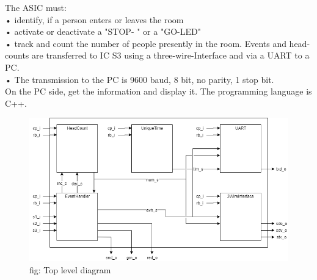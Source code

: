 \documentclass[12pt,a4 paper] {report}
\begin{document}
The ASIC must:\\
• identify, if a person enters or leaves the room\\
• activate or deactivate a "STOP- " or a "GO-LED"\\
• track and count the number of people presently in the room. Events and head-counts are transferred to IC S3 using a three-wire-Interface and via a UART to a PC. \\
• The transmission to the PC is 9600 baud, 8 bit, no parity, 1 stop bit. \\
On the PC side, get the information and display it. The programming language is
C++.\\

\begin{figure}[h]
	\centering	
	\includegraphics[scale=0.3]{../png/top.png}
	fig: Top level diagram\\
\end{figure}

\newpage
\end{document}
